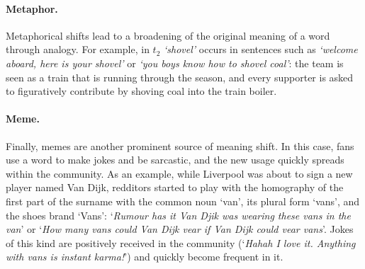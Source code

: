 \paragraph{Metaphor.}
Metaphorical shifts lead to a broadening of the original meaning of a
word through analogy.
For example, in $t_2$ {\em `shovel'} occurs in sentences such as \textit{`welcome aboard, here is your shovel'} or 
\textit{`you boys know how to shovel coal'}: the team is seen as a train that is running through the season, and every supporter is asked to figuratively contribute by shoving coal into the train boiler. 

\paragraph{Meme.}
Finally, memes are another prominent source of meaning shift. 
In this case, fans use a word to make jokes and be sarcastic, and the new usage quickly spreads within the community. 
As an example, while Liverpool was about to sign a new player named Van Dijk, redditors started to play with the homography of the first part of the surname with the common noun `van', its plural form `vans', and the shoes brand `Vans': `\textit{Rumour has it Van Djik was wearing these vans in the van}' or `\textit{How many vans could Van Dijk vear if Van Dijk could vear vans}'. 
Jokes of this kind are positively received in the community (`\textit{Hahah I love it. Anything with vans is instant karma!}') and quickly become frequent in it.

